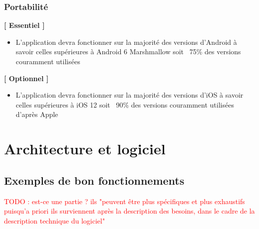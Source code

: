 \documentclass{article}
\newcommand\todo[1]{\textcolor{red}{#1}}
\begin{document}
		\subsubsection{Portabilité}
		\textbf{[ Essentiel ]}
		\begin{itemize}
			\item L'application devra fonctionner sur la majorité des versions d'Android à savoir celles supérieures à Android 6 Marshmallow soit ~75\% des versions couramment utilisées \cite{AndroidVersion2019}
		\end{itemize}
		\textbf{[ Optionnel ]}
		\begin{itemize}
			\item L'application devra fonctionner sur la majorité des versions d'iOS à savoir celles supérieures à iOS 12 soit ~90\% des versions couramment utilisées d'après Apple  \cite{iOSVersion2019}
		\end{itemize}

		\section{Architecture et logiciel}
	    \subsection{Exemples de bon fonctionnements}
	    \todo{TODO : est-ce une partie ?  ils  "peuvent être plus spécifiques et plus exhaustifs
                puisqu'a priori ils surviennent après la description des besoins,
                dans le cadre de la description technique du logiciel"}
        
        \newpage
\end{document}
